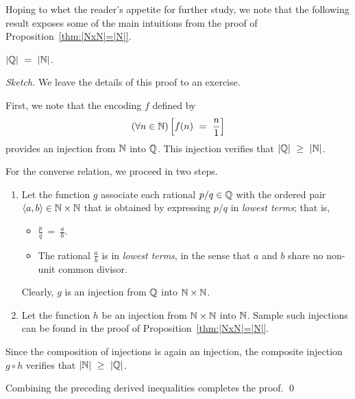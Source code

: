 \smallskip

\hspace*{.35in}{\em the set $\N$ has the same cardinality as the set $\Q$.}

\smallskip

\noindent
Hoping to whet the reader's appetite for further study, we note that the following result exposes some of the main intuitions from the proof of Proposition~\ref{thm:|NxN|=|N|}.

\begin{prop}
\label{thm:|Q|=|N|}
$|\mathbb{Q}| \ = \ |\mathbb{N}|$.
\end{prop}

\begin{proof}[Sketch]
We leave the details of this proof to an exercise.

\smallskip

First, we note that the encoding $f$ defined by
\[ (\forall n \in \N) \left[ f(n) \ = \ \frac{n}{1} \right] \]
provides an injection from $\N$ into $\Q$.  This injection verifies that $|\mathbb{Q}| \ \geq \ |\mathbb{N}|$.

\smallskip

For the converse relation, we proceed in two steps.
\begin{enumerate}
\item
Let the function $g$ associate each rational $p/q \in \mathbb{Q}$ with the ordered pair $\langle a, b \rangle \in \mathbb{N} \times \mathbb{N}$ that is obtained by expressing $p/q$ in {\em lowest terms}; that is,
  \begin{itemize}
  \item
$\displaystyle \frac{p}{q} \ = \ \frac{a}{b}$.
  \medskip\item
The rational $\displaystyle \frac{a}{b}$ is in {\em lowest terms}, in the sense that $a$ and $b$ share no non-unit common divisor.
  \end{itemize}
Clearly, $g$ is an injection from $\Q$ into $\mathbb{N} \times \mathbb{N}$.

\medskip\item
Let the function $h$ be an injection from $\mathbb{N} \times \mathbb{N}$ into $\N$.  Sample such injections can be found in the proof of Proposition~\ref{thm:|NxN|=|N|}.
\end{enumerate}
Since the composition of injections is again an injection, the composite injection $g \circ h$ verifies that $|\mathbb{N}| \ \geq \ |\mathbb{Q}|$.

\smallskip

Combining the preceding derived inequalities completes the proof.
\qed
\end{proof}


